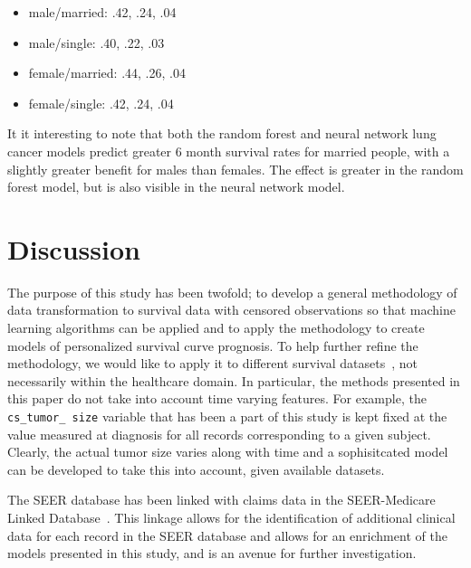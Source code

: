 \documentclass[10pt,letterpaper]{article}
\newcommand{\codewhite}[1]{\colorbox{white}{\texttt{#1}}}
\begin{document}
\begin{itemize}[noitemsep]
\item male/married: .42, .24, .04
\item male/single: .40, .22, .03
\item female/married: .44, .26, .04
\item female/single: .42, .24, .04
\end{itemize}

It it interesting to note that both the random forest and neural network lung cancer models predict greater 6 month survival rates for married people, with a slightly greater benefit for males than females. The effect is greater in the random forest model, but is also visible in the neural network model. 





\section*{Discussion}
\label{sec:discussion}


The purpose of this study has been twofold; to develop a general methodology of data transformation to survival data with censored observations so that machine learning algorithms can be applied and to apply the methodology to create models of personalized survival curve prognosis.
To help further refine the methodology, we would like to apply it to different survival datasets~\cite{umass}, not necessarily within the healthcare domain. In particular, the methods presented in this paper do not take into account time varying features. For example, the \codewhite{cs\_tumor\_ size} variable that has been a part of this study is kept fixed at the value measured at diagnosis for all records corresponding to a given subject. Clearly, the actual tumor size varies along with time and a sophisitcated model can be developed to take this into account, given available datasets.



The SEER database has been linked with claims data in the SEER-Medicare Linked Database~\cite{seermed}. This linkage allows for the identification of additional clinical data for each record in the SEER database and allows for an enrichment of the models presented in this study, and is an avenue for further investigation.
\end{document}
